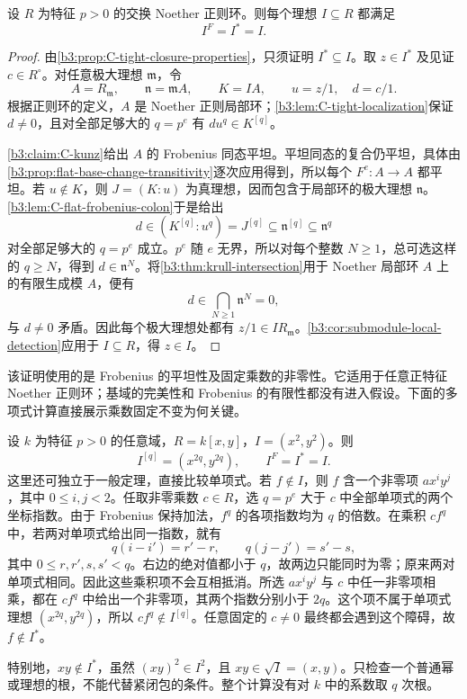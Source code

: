\begin{theorem}\label{b3:thm:C-regular-tight-closure}
	设 \(R\) 为特征 \(p>0\) 的交换 Noether 正则环。则每个理想 \(I\subseteq R\) 都满足
	\[
		I^F=I^*=I.
	\]
\end{theorem}
\begin{proof}
	由\cref{b3:prop:C-tight-closure-properties}，只须证明 \(I^*\subseteq I\)。取 \(z\in I^*\) 及见证 \(c\in R^\circ\)。对任意极大理想 \(\mathfrak m\)，令
	\[
		A=R_{\mathfrak m},\qquad
		\mathfrak n=\mathfrak mA,\qquad K=IA,\qquad
		u=z/1,\quad d=c/1.
	\]
	根据正则环的定义，\(A\) 是 Noether 正则局部环；\cref{b3:lem:C-tight-localization}保证 \(d\ne0\)，且对全部足够大的 \(q=p^e\) 有 \(du^q\in K^{[q]}\)。

	\cref{b3:claim:C-kunz}给出 \(A\) 的 Frobenius 同态平坦。平坦同态的复合仍平坦，具体由\cref{b3:prop:flat-base-change-transitivity}逐次应用得到，所以每个 \(F^e:A\rightarrow A\) 都平坦。若 \(u\notin K\)，则 \(J=(K:u)\) 为真理想，因而包含于局部环的极大理想 \(\mathfrak n\)。\cref{b3:lem:C-flat-frobenius-colon}于是给出
	\[
		d\in(K^{[q]}:u^q)=J^{[q]}
		\subseteq\mathfrak n^{[q]}\subseteq\mathfrak n^q
	\]
	对全部足够大的 \(q=p^e\) 成立。\(p^e\) 随 \(e\) 无界，所以对每个整数 \(N\ge1\)，总可选这样的 \(q\ge N\)，得到 \(d\in\mathfrak n^N\)。将\cref{b3:thm:krull-intersection}用于 Noether 局部环 \(A\) 上的有限生成模 \(A\)，便有
	\[
		d\in\bigcap_{N\ge1}\mathfrak n^N=0,
	\]
	与 \(d\ne0\) 矛盾。因此每个极大理想处都有 \(z/1\in IR_{\mathfrak m}\)。\cref{b3:cor:submodule-local-detection}应用于 \(I\subseteq R\)，得 \(z\in I\)。
\end{proof}

该证明使用的是 Frobenius 的平坦性及固定乘数的非零性。它适用于任意正特征 Noether 正则环；基域的完美性和 Frobenius 的有限性都没有进入假设。下面的多项式计算直接展示乘数固定不变为何关键。

\begin{example}\label{b3:exm:C-polynomial-tight-ideal}
	设 \(k\) 为特征 \(p>0\) 的任意域，\(R=k[x,y]\)，\(I=(x^2,y^2)\)。则
	\[
		I^{[q]}=(x^{2q},y^{2q}),\qquad I^F=I^*=I.
	\]
	这里还可独立于一般定理，直接比较单项式。若 \(f\notin I\)，则 \(f\) 含一个非零项 \(a x^i y^j\)，其中 \(0\le i,j<2\)。任取非零乘数 \(c\in R\)，选 \(q=p^e\) 大于 \(c\) 中全部单项式的两个坐标指数。由于 Frobenius 保持加法，\(f^q\) 的各项指数均为 \(q\) 的倍数。在乘积 \(cf^q\) 中，若两对单项式给出同一指数，就有
	\[
		q(i-i')=r'-r,\qquad q(j-j')=s'-s,
	\]
	其中 \(0\le r,r',s,s'<q\)。右边的绝对值都小于 \(q\)，故两边只能同时为零；原来两对单项式相同。因此这些乘积项不会互相抵消。所选 \(a x^i y^j\) 与 \(c\) 中任一非零项相乘，都在 \(cf^q\) 中给出一个非零项，其两个指数分别小于 \(2q\)。这个项不属于单项式理想 \((x^{2q},y^{2q})\)，所以 \(cf^q\notin I^{[q]}\)。任意固定的 \(c\ne0\) 最终都会遇到这个障碍，故 \(f\notin I^*\)。

	\ProseParagraphBreak
	特别地，\(xy\notin I^*\)，虽然 \((xy)^2\in I^2\)，且 \(xy\in\sqrt I=(x,y)\)。只检查一个普通幂或理想的根，不能代替紧闭包的条件。整个计算没有对 \(k\) 中的系数取 \(q\) 次根。
\end{example}

